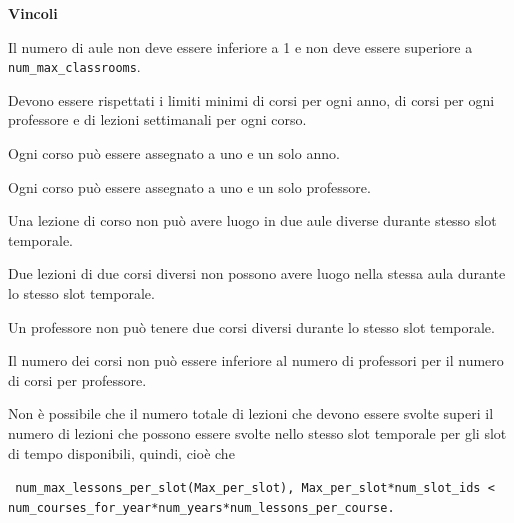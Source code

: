 \documentclass[a4paper,oneside,12pt]{book}
\def \code#1{\texttt{#1}}
\begin{document}
\begin{description}[align=left]
        \item \textbf{Vincoli}
        \item [--] Il numero di aule non deve essere inferiore a 1 e non deve essere superiore a \code{num\_max\_classrooms}.
        \item [--] Devono essere rispettati i limiti minimi di corsi per ogni anno, di corsi per ogni professore e di lezioni settimanali per ogni corso.
        \item [--] Ogni corso può essere assegnato a uno e un solo anno.
        \item [--] Ogni corso può essere assegnato a uno e un solo professore.
        \item [--] Una lezione di corso non può avere luogo in due aule diverse durante stesso slot temporale.
        \item [--] Due lezioni di due corsi diversi non possono avere luogo nella stessa aula durante lo stesso slot temporale.
        \item [--] Un professore non può tenere due corsi diversi durante lo stesso slot temporale.
        \item [--] Il numero dei corsi non può essere inferiore al numero di professori per il numero di corsi per professore.
        \item [--] Non è possibile che il numero totale di lezioni che devono essere svolte superi il numero di lezioni che possono essere svolte nello stesso slot temporale per gli slot di tempo disponibili, quindi,  cioè che \begin{center}
                                                                                                                                                                                                                                       \code{
                                                                                                                                                                                                                                       num\_max\_lessons\_per\_slot(Max\_per\_slot), Max\_per\_slot*num\_slot\_ids < num\_courses\_for\_year*num\_years*num\_lessons\_per\_course.}
        \end{center}

    \end{description}
\end{document}
